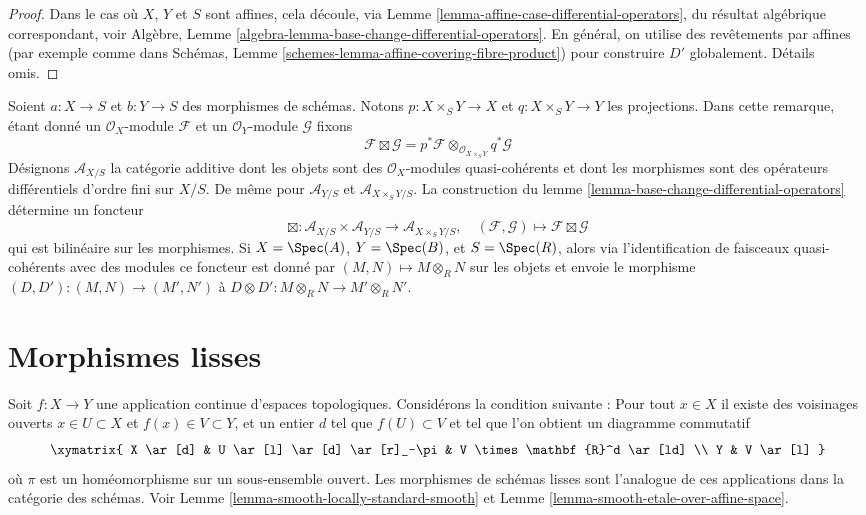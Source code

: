 \begin{proof}
Dans le cas où $X$, $Y$ et $S$
sont affines, cela découle, via Lemme \ref{lemma-affine-case-differential-operators},
du résultat algébrique correspondant,
voir Algèbre, Lemme \ref{algebra-lemma-base-change-differential-operators}. En général, on
utilise des revêtements par affines
(par exemple comme dans Schémas,
Lemme \ref{schemes-lemma-affine-covering-fibre-product}) pour construire $D'$
globalement. Détails omis.
\end{proof}

\begin{remark}
\label{remark-base-change-differential-operators}
Soient $a : X \to S$ et $b : Y \to S$ des morphismes de schémas.
Notons $p : X \times_S Y \to X$ et $q : X \times_S Y \to Y$ les projections.
Dans cette remarque, étant donné un $\mathcal{O}_X$-module $\mathcal{F}$
et un $\mathcal{O}_Y$-module $\mathcal{G}$ fixons
$$
\mathcal{F} \boxtimes \mathcal{G} =
p^*\mathcal{F} \otimes_{\mathcal{O}_{X \times_S Y}} q^*\mathcal{G}
$$
Désignons $\mathcal{A}_{X/S}$ la catégorie additive
dont les objets sont des $\mathcal{O}_X$-modules quasi-cohérents
et dont les morphismes sont des opérateurs différentiels
d'ordre fini sur $X/S$. De même pour $\mathcal{A}_{Y/S}$
et $\mathcal{A}_{X \times_S Y/S}$. La construction du lemme \ref{lemma-base-change-differential-operators} détermine
un foncteur
$$
\boxtimes : 
\mathcal{A}_{X/S} \times \mathcal{A}_{Y/S} \longrightarrow
\mathcal{A}_{X \times_S Y/S},
\quad
(\mathcal{F}, \mathcal{G}) \longmapsto \mathcal{F} \boxtimes \mathcal{G}
$$
qui est bilinéaire sur les morphismes. Si $X = \Spec(A)$, $Y = \Spec(B)$,
et $S = \Spec(R)$, alors via l'identification de
faisceaux quasi-cohérents avec des modules ce foncteur
est donné par $(M, N) \mapsto M \otimes_R N$ sur les objets et envoie
le morphisme $(D, D') : (M, N) \to (M', N')$ à $D \otimes D' : M \otimes_R N \to M' \otimes_R N'$.
\end{remark}








\section{Morphismes lisses}
\label{section-smooth}

\noindent
Soit $f : X \to Y$ une application continue d'espaces topologiques.
Considérons la condition
suivante : Pour tout $x \in X$ il existe des voisinages
ouverts $x \in U \subset X$ et $f(x) \in V \subset Y$, et un entier $d$
tel que $f(U) \subset V$ et tel que l'on obtient un diagramme
commutatif
$$
\xymatrix{
X \ar[d] &
U \ar[l] \ar[d] \ar[r]_-\pi &
V \times \mathbf{R}^d \ar[ld] \\
Y & V \ar[l]
}
$$
où $\pi$ est un homéomorphisme sur un sous-ensemble
ouvert. Les morphismes de schémas lisses
sont l'analogue de ces applications
dans la catégorie des schémas.
Voir
Lemme \ref{lemma-smooth-locally-standard-smooth} et Lemme \ref{lemma-smooth-etale-over-affine-space}.

